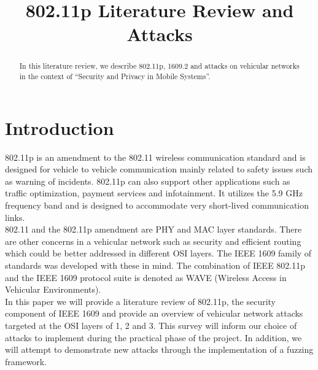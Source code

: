 \documentclass[conference]{IEEEtran}
\title{802.11p Literature Review and Attacks}
\author{\IEEEauthorblockN{Aniket Chaudhari and Alvin Cai and Wouter de Groot and Erik Schneider}
\IEEEauthorblockA{Technische Universiteit Eindhoven\\
Eindhoven, The Netherlands\\
\\
September 30, 2014}}
\begin{document}
\maketitle

\begin{abstract}
In this literature review, we describe 802.11p, 1609.2 and attacks on vehicular networks in the context of “Security and Privacy in Mobile Systems”.
\end{abstract}

\section{Introduction}

\begin{comment}
I think we should amend the first paragraph to provide an overview of VANET in general before jumping into 802.11p.

I made some amendments to para 2 and 3, to align to the modified scope. i.e. 
a) The literature review is the main meat of this project
b) It must provide a comprehensive survey of different attacks 
c) We can explain the attacks we want to implement in more detail
d) Focus on attacks in OSI layer 1-3
\end{comment}

802.11p is an amendment to the 802.11 wireless communication standard and is designed for vehicle to vehicle communication mainly related to safety issues such as warning of incidents. 802.11p can also support other applications such as traffic optimization, payment services and infotainment. It utilizes the 5.9 GHz frequency band and is designed to accommodate very short-lived communication links.\\

802.11 and the 802.11p amendment are PHY and MAC layer standards. There are other concerns in a vehicular network such as security and efficient routing which could be better addressed in different OSI layers. The IEEE 1609 family of standards was developed with these in mind. The combination of IEEE 802.11p and the IEEE 1609 protocol suite is denoted as WAVE (Wireless Access in Vehicular Environments).\\

In this paper we will provide a literature review of 802.11p, the security component of IEEE 1609 and provide an overview of vehicular network attacks targeted at the OSI layers of 1, 2 and 3. This survey will inform our choice of attacks to implement during the practical phase of the project. In addition, we will attempt to demonstrate new attacks through the implementation of a fuzzing framework.
\end{document}
